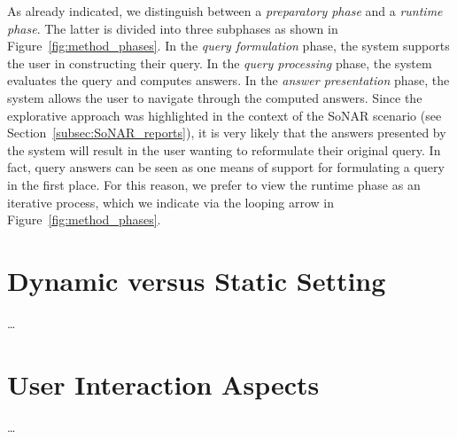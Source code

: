 As already indicated, we distinguish between a \emph{preparatory phase}
and a \emph{runtime phase}.
The latter is divided into three subphases as shown in Figure~\ref{fig:method_phases}.
In the \emph{query formulation} phase, the system supports the user 
in constructing their query.
In the \emph{query processing} phase, the system evaluates the query
and computes answers.
In the \emph{answer presentation} phase, the system allows the user to
navigate through the computed answers.
Since the explorative approach was highlighted
in the context of the \gls{SoNAR} scenario (see Section~\ref{subsec:SoNAR_reports}),
it is very likely that the answers presented by the system will 
result in the user wanting to reformulate their original query.
In fact, query answers can be seen as one means of support
for formulating a query in the first place.
For this reason, we prefer to view the runtime phase as an iterative process,
which we indicate via the looping arrow in Figure~\ref{fig:method_phases}.





\section{Dynamic versus Static Setting}
\label{sec:dynamic_vs_static}

\dots

\section{User Interaction Aspects}
\label{sec:user_interaction}

\dots



